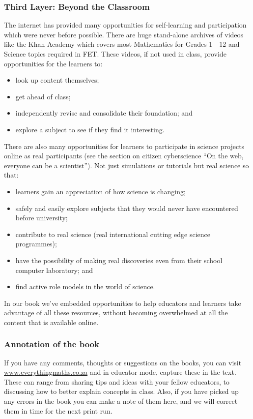\subsubsection{Third Layer: Beyond the Classroom}
The internet has provided many opportunities for self-learning and participation which were never before possible. There are huge stand-alone archives of videos like the Khan Academy which covers most Mathematics for Grades 1 - 12 and Science topics required in FET. These videos, if not used in class, provide opportunities for the learners to:
\begin{itemize}
\item look up content themselves;
\item get ahead of class;
\item independently revise and consolidate their foundation; and
\item explore a subject to see if they find it interesting.
\end{itemize}
There are also many opportunities for learners to participate in science projects online as real participants (see the section on citizen cyberscience “On the web, everyone can be a scientist”). Not just simulations or tutorials but real science so that:
\begin{itemize}
\item learners gain an appreciation of how science is changing;
\item safely and easily explore subjects that they would never have encountered before university;
\item contribute to real science (real international cutting edge science programmes);
\item have the possibility of making real discoveries even from their school computer laboratory; and
\item find active role models in the world of science.
\end{itemize}
In our book we've embedded opportunities to help educators and learners take advantage of all these resources, without becoming overwhelmed at all the content that is available online. 

\subsubsection{Annotation of the book}
If you have any comments, thoughts or suggestions on the books, you can visit  \url{www.everythingmaths.co.za} and in educator mode, capture these in the text. These can range from sharing tips and ideas with your fellow educators, to discussing how to better explain concepts in class. Also, if you have picked up any errors in the book you can make a note of them here, and we will correct them in time for the next print run.\par

